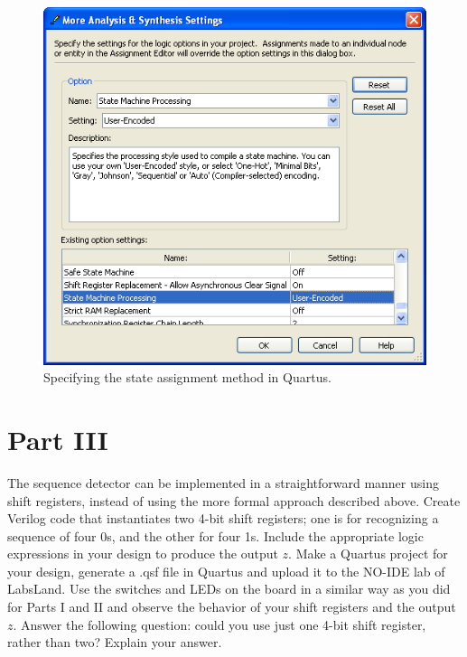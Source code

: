 \documentclass[epsfig,10pt,fullpage]{article}
\begin{document}
\begin{figure}[H]
\centerline{
\includegraphics[scale = 0.75]{figures/figure4.png}}
\caption{Specifying the state assignment method in Quartus.}
\label{fig:fig7_4}
\end{figure}

\section*{Part III}
The sequence detector can be implemented in a straightforward manner using shift registers,
instead of using the more formal approach described above. Create Verilog code that
instantiates two 4-bit shift registers; one is for recognizing a sequence of four 0s, and
the other for four 1s. Include the appropriate logic expressions in your design
to produce the output $z$. Make a Quartus project for your design, generate a .qsf file in Quartus and upload it to the NO-IDE lab of LabsLand. Use the switches and LEDs on the board in a similar way as
you did for Parts I and II and observe the behavior of your shift registers and the
output $z$. Answer the following question: could you use just one 4-bit shift
register, rather than two? Explain your answer.

~\newpage
\end{document}
